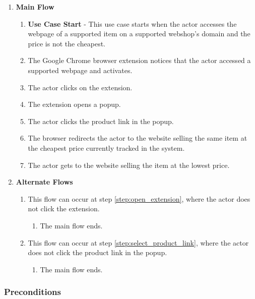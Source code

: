 \documentclass[12pt,a4paper,twoside]{report}
\begin{document}
\begin{enumerate}

  \item \textbf{Main Flow}

  \begin{enumerate}
    \item \textbf{Use Case Start} - This use case starts when the actor accesses the webpage of a supported item on a supported webshop’s domain and the price is not the cheapest.
    \item The Google Chrome browser extension notices that the actor accessed a supported webpage and activates.
    \item The actor clicks on the extension. \label{step:open_extension}
    \item The extension opens a popup.
    \item The actor clicks the product link in the popup. \label{step:select_product_link}
    \item The browser redirects the actor to the website selling the same item at the cheapest price currently tracked in the system.
    \item The actor gets to the website selling the item at the lowest price.
  \end{enumerate}


  \item \textbf{Alternate Flows}

  \begin{enumerate}
    \item This flow can occur at step \ref{step:open_extension}, where the actor does not click the extension.
    \begin{enumerate}
      \item The main flow ends.
    \end{enumerate}

    \item This flow can occur at step \ref{step:select_product_link}, where the actor does not click the product link in the popup.
    \begin{enumerate}
      \item The main flow ends.
    \end{enumerate}
  \end{enumerate}

\end{enumerate}


\subsubsection{Preconditions}
\end{document}
